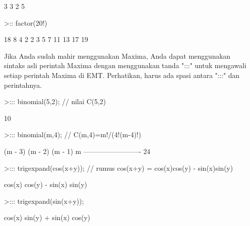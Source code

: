 \documentclass[a4paper,10pt]{article}
\begin{document}
\begin{eulernotebook}
\begin{euleroutput}
                                   3  3
                                  2  5
  
\end{euleroutput}
\begin{eulerprompt}
>:: factor(20!)
\end{eulerprompt}
\begin{euleroutput}
  
                          18  8  4  2
                         2   3  5  7  11 13 17 19
  
\end{euleroutput}
\begin{eulercomment}
Jika Anda sudah mahir menggunakan Maxima, Anda dapat menggunakan
sintaks asli perintah Maxima dengan menggunakan tanda ":::" untuk
mengawali setiap perintah Maxima di EMT. Perhatikan, harus ada spasi
antara ":::" dan perintahnya.
\end{eulercomment}
\begin{eulerprompt}
>::: binomial(5,2); // nilai C(5,2)
\end{eulerprompt}
\begin{euleroutput}
  
                                    10
  
\end{euleroutput}
\begin{eulerprompt}
>::: binomial(m,4); // C(m,4)=m!/(4!(m-4)!)
\end{eulerprompt}
\begin{euleroutput}
  
                        (m - 3) (m - 2) (m - 1) m
                        -------------------------
                                   24
  
\end{euleroutput}
\begin{eulerprompt}
>::: trigexpand(cos(x+y)); // rumus cos(x+y) = cos(x)cos(y) - sin(x)sin(y) 
\end{eulerprompt}
\begin{euleroutput}
  
                      cos(x) cos(y) - sin(x) sin(y)
  
\end{euleroutput}
\begin{eulerprompt}
>::: trigexpand(sin(x+y));
\end{eulerprompt}
\begin{euleroutput}
  
                      cos(x) sin(y) + sin(x) cos(y)
  

\end{euleroutput}
\end{eulernotebook}
\end{document}
